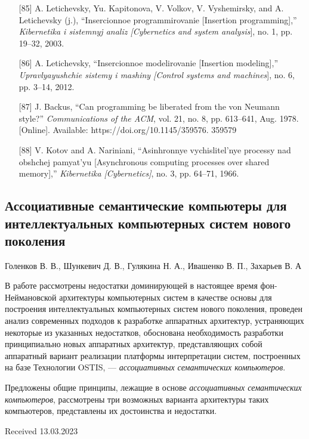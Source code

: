 \documentclass[10pt]{article}
\begin{document}
{\begin{multicols*}{2}
\begin{enumerate}
{{Distributed Computing}, vol. 2, no. 2, pp. 109–131, 1985.
[Online]. Available: https://www.sciencedirect.com/science/article/
pii/0743731585900310} 
\item[{[85]}]{A. Letichevsky, Yu. Kapitonova, V. Volkov, V. Vyshemirsky, and
A. Letichevsky (j.), “Insercionnoe programmirovanie [Insertion
programming],” \textit{Kibernetika i sistemnyj analiz [Cybernetics and
system analysis}], no. 1, pp. 19–32, 2003.} 
\item[{[86]}]{A. Letichevsky, “Insercionnoe modelirovanie [Insertion modeling],”\textit{ Upravlyayushchie sistemy i mashiny [Control systems and
machines}], no. 6, pp. 3–14, 2012.} 
\item[{[87]}]{J. Backus, “Can programming be liberated from the von Neumann
style?” \textit{Communications of the ACM}, vol. 21, no. 8, pp. 613–641,
Aug. 1978. [Online]. Available: https://doi.org/10.1145/359576.
359579} 
\item[{[88]}]{V. Kotov and A. Nariniani, “Asinhronnye vychislitel’nye processy
nad obshchej pamyat’yu [Asynchronous computing processes over
shared memory],” \textit{Kibernetika [Cybernetics]}, no. 3, pp. 64–71,
1966.} 
\end{enumerate}
\begin{center}
\subsection*{Ассоциативные семантические
компьютеры для интеллектуальных
компьютерных систем нового поколения}
\Large Голенков В. В., Шункевич Д. В.,
Гулякина Н. А., Ивашенко В. П.,
Захарьев В. А
\end{center}

В работе рассмотрены недостатки доминирующей
в настоящее время фон-Неймановской архитектуры
компьютерных систем в качестве основы для построения интеллектуальных компьютерных систем нового
поколения, проведен анализ современных подходов
к разработке аппаратных архитектур, устраняющих
некоторые из указанных недостатков, обоснована
необходимость разработки принципиально новых аппаратных архитектур, представляющих собой аппаратный
вариант реализации платформы интерпретации систем,
построенных на базе Технологии OSTIS, — \textit{ассоциативных семантических компьютеров}.

Предложены общие принципы, лежащие в основе \textit{ассоциативных семантических компьютеров}, рассмотрены три возможных варианта архитектуры таких компьютеров, представлены их достоинства и недостатки.
\vspace{5pt}
\begin{flushright}
Received 13.03.2023
\end{flushright}
\end{multicols*}

}
\end{document}
